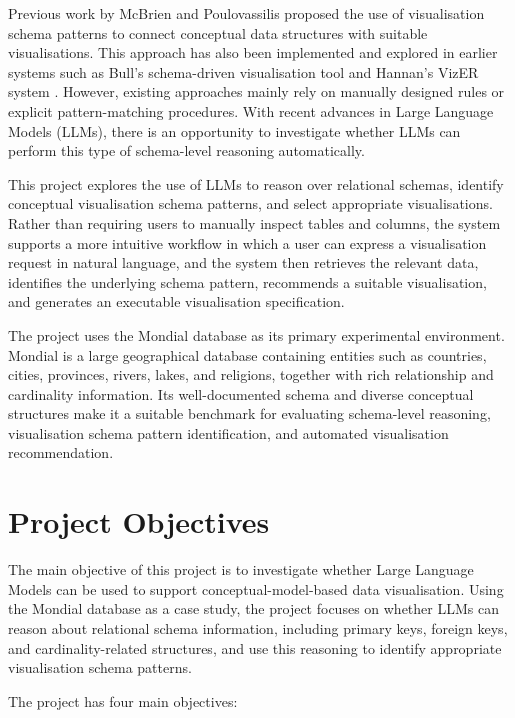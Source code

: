 Previous work by McBrien and Poulovassilis proposed the use of visualisation schema patterns to connect conceptual data structures with suitable visualisations. This approach has also been implemented and explored in earlier systems such as Bull's schema-driven visualisation tool \cite{bull2023visualisation} and Hannan's VizER system \cite{hannan2024vizer}. However, existing approaches mainly rely on manually designed rules or explicit pattern-matching procedures. With recent advances in Large Language Models (LLMs), there is an opportunity to investigate whether LLMs can perform this type of schema-level reasoning automatically.

This project explores the use of LLMs to reason over relational schemas, identify conceptual visualisation schema patterns, and select appropriate visualisations. Rather than requiring users to manually inspect tables and columns, the system supports a more intuitive workflow in which a user can express a visualisation request in natural language, and the system then retrieves the relevant data, identifies the underlying schema pattern, recommends a suitable visualisation, and generates an executable visualisation specification.

The project uses the Mondial database \cite{mondial} as its primary experimental environment. Mondial is a large geographical database containing entities such as countries, cities, provinces, rivers, lakes, and religions, together with rich relationship and cardinality information. Its well-documented schema and diverse conceptual structures make it a suitable benchmark for evaluating schema-level reasoning, visualisation schema pattern identification, and automated visualisation recommendation.


\section{Project Objectives}

The main objective of this project is to investigate whether Large Language Models can be used to support conceptual-model-based data visualisation. Using the Mondial database as a case study, the project focuses on whether LLMs can reason about relational schema information, including primary keys, foreign keys, and cardinality-related structures, and use this reasoning to identify appropriate visualisation schema patterns.


The project has four main objectives:

